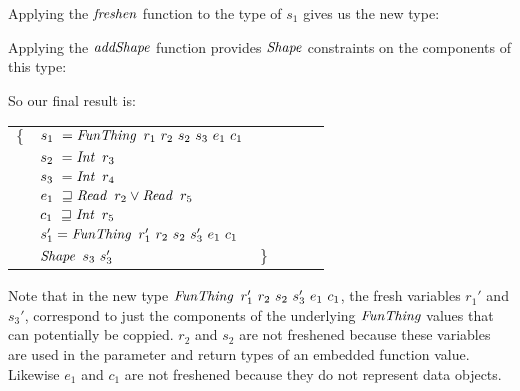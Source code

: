 Applying the $\operatorname{\mathit{freshen}}$ function to the type of $s_1$ gives us the new type:


\clearpage{}
Applying the $\operatorname{\mathit{addShape}}$ function provides $\operatorname{\mathit{Shape}}$ constraints on the components of this type:


So our final result is:

\quad\quad\quad
\begin{tabular}{llllll}
	$\{$
	& $s_1 \ = \operatorname{\mathit{FunThing}} \ r_1 \ r_2 \ s_2 \ s_3 \ e_1 \ c_1$ \\
	& $s_2 \ = \iInt \ r_3$ \\
	& $s_3 \ = \iInt \ r_4$ \\
	& $e_1 \ \sqsupseteq \operatorname{\mathit{Read}} \ r_2 \lor \operatorname{\mathit{Read}} \ r_5$ \\
	& $c_1 \ \sqsupseteq \operatorname{\mathit{Int}} \ r_5$ \\[1ex]
	& $s_1' = \operatorname{\mathit{FunThing}} \ r_1' \ r_2 \ s_2 \ s_3' \ e_1 \ c_1$ \\
	& $\iShape \ s_3 \ s_3'$
	& $\}$
\end{tabular}

Note that in the new type $\iFunThing \ r_1' \ r_2 \ s_2 \ s_3' \ e_1 \ c_1$, the fresh variables $r_1'$ and $s_3'$, correspond to just the components of the underlying $\operatorname{\mathit{FunThing}}$ values that can potentially be coppied. $r_2$ and $s_2$ are not freshened because these variables are used in the parameter and return types of an embedded function value. Likewise $e_1$ and $c_1$ are not freshened because they do not represent data objects.

